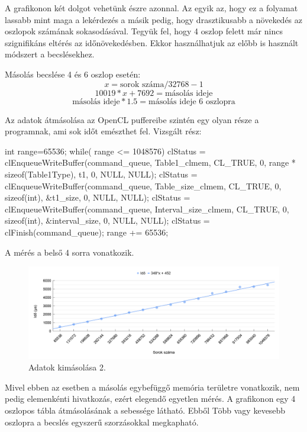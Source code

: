 A grafikonon két dolgot vehetünk észre azonnal. Az egyik az, hogy ez a folyamat lassabb mint maga a lekérdezés a másik pedig, hogy drasztikusabb a növekedés az oszlopok számának sokasodásával.
Tegyük fel, hogy 4 oszlop felett már nincs szignifikáns eltérés az időnövekedésben. Ekkor használhatjuk az előbb is használt módszert a becslésekhez.

Másolás becslése 4 és 6 oszlop esetén:
$$ x = \text{sorok száma}/32768 - 1 $$
$$ 10019 * x + 7692 = \text{másolás ideje}$$
$$ \text{másolás ideje} * 1.5 = \text{másolás ideje 6 oszlopra} $$


Az adatok átmásolása az OpenCL puffereibe szintén egy olyan része a programnak, ami sok időt emészthet fel.
Vizsgált rész:

\begin{python}
int range=65536;
while( range <= 1048576){
 clStatus = clEnqueueWriteBuffer(command_queue, Table1_clmem,
  CL_TRUE, 0, range * sizeof(Table1Type), t1, 0, NULL, NULL);
 clStatus = clEnqueueWriteBuffer(command_queue, Table_size_clmem,
  CL_TRUE, 0, sizeof(int), &t1_size, 0, NULL, NULL);
 clStatus = clEnqueueWriteBuffer(command_queue, Interval_size_clmem,
  CL_TRUE, 0, sizeof(int), &interval_size, 0, NULL, NULL);
 clStatus = clFinish(command_queue);
	range += 65536;
}
\end{python}

A mérés a belső 4 sorra vonatkozik. 

\begin{figure}[h!]
\centering
\includegraphics[width=\textwidth]{images/inpuffer.png}
\caption{Adatok kimásolása 2.}
\label{fig:schema}
\end{figure}

Mivel ebben az esetben a másolás egybefüggő memória területre vonatkozik, nem pedig elemenkénti hivatkozás, ezért elegendő egyetlen mérés.
A grafikonon egy 4 oszlopos tábla átmásolásának a sebessége látható. Ebből Több vagy kevesebb oszlopra a becslés egyszerű szorzásokkal megkapható.

